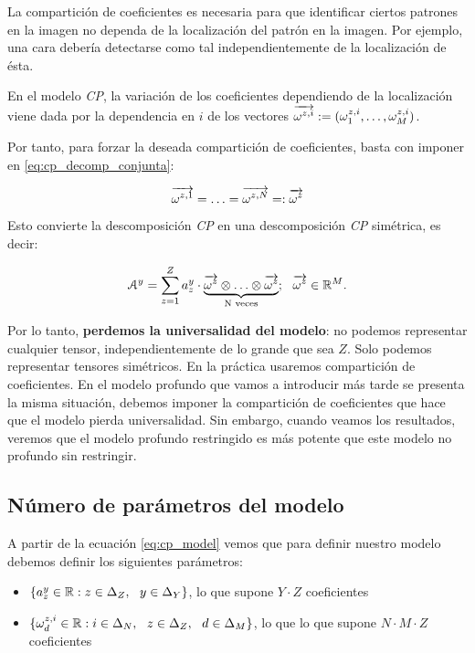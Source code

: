 La compartición de coeficientes es necesaria para que identificar ciertos patrones en la imagen no dependa de la localización del patrón en la imagen. Por ejemplo, una cara debería detectarse como tal independientemente de la localización de ésta.

En el modelo \textit{CP}, la variación de los coeficientes dependiendo de la localización viene dada por la dependencia en $i$ de los vectores $\overrightarrow{\omega^{z,i}} := (\omega^{z, i}_1, \ldots, \omega^{z, i}_M)$.

Por tanto, para forzar la deseada compartición de coeficientes, basta con imponer en \eqref{eq:cp_decomp_conjunta}:

\begin{equation}
	\overrightarrow{\omega^{z, 1}} = \ldots = \overrightarrow{\omega^{z, N}} =: \overrightarrow{\omega^z}
\end{equation}

Esto convierte la descomposición \textit{CP} en una descomposición \textit{CP} simétrica, es decir:

\begin{equation}
	\mathcal{A}^y = \sum_{z = 1}^Z a_z^y \cdot \underbrace{\overrightarrow{\omega^z} \otimes \ldots \otimes \overrightarrow{\omega^z}}_\textrm{N veces}; \ \  \overrightarrow{\omega^z} \in \mathbb{R}^M.
\end{equation}

Por lo tanto, \textbf{perdemos la universalidad del modelo}: no podemos representar cualquier tensor, independientemente de lo grande que sea $Z$. Solo podemos representar tensores simétricos. En la práctica usaremos compartición de coeficientes. En el modelo profundo que vamos a introducir más tarde se presenta la misma situación, debemos imponer la compartición de coeficientes que hace que el modelo pierda universalidad. Sin embargo, cuando veamos los resultados, veremos que el modelo profundo restringido es más potente que este modelo no profundo sin restringir.

\subsection{Número de parámetros del modelo} \label{msubsec:parametros_modelo_cp}

A partir de la ecuación \eqref{eq:cp_model} vemos que para definir nuestro modelo debemos definir los siguientes parámetros:

\begin{itemize}
	\item $\{a_z^y \in \mathbb{R} : z \in \Delta_{Z}, \ \  y \in \Delta_{Y}\}$, lo que supone $Y \cdot Z$ coeficientes
	\item $\{\omega_d^{z, i} \in \mathbb{R}: i \in \Delta_{N}, \ \  z \in \Delta_{Z}, \ \  d \in \Delta_{M}\}$, lo que lo que supone $N \cdot M \cdot Z$ coeficientes
\end{itemize}

